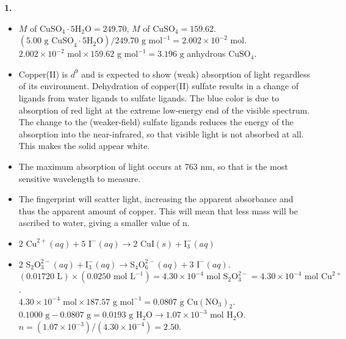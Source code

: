 \documentclass[10pt,a4paper]{article}
\begin{document}
\textbf{1.}
\begin{itemize}
    \item[a.] $M$ of $\text{CuSO}_4\cdot5\text{H}_2\text{O} = 249.70$, $M$ of $\text{CuSO}_4 = 159.62$. \\
    $(5.00\text{ g CuSO}_4\cdot5\text{H}_2\text{O})/249.70\text{ g mol}^{-1} = 2.002 \times 10^{-2}\text{ mol}$. \\
    $2.002 \times 10^{-2}\text{ mol} \times 159.62\text{ g mol}^{-1} = 3.196\text{ g}$ anhydrous $\text{CuSO}_4$.
     \item[b.] Copper(II) is $d^9$ and is expected to show (weak) absorption of light regardless of its environment. Dehydration of copper(II) sulfate results in a change of ligands from water ligands to sulfate ligands. The blue color is due to absorption of red light at the extreme low-energy end of the visible spectrum. The change to the (weaker-field) sulfate ligands reduces the energy of the absorption into the near-infrared, so that visible light is not absorbed at all. This makes the solid appear white.
    \item[c.] The maximum absorption of light occurs at 763 nm, so that is the most sensitive wavelength to measure.
    \item[d.] The fingerprint will scatter light, increasing the apparent absorbance and thus the apparent amount of copper. This will mean that less mass will be ascribed to water, giving a smaller value of n.
    \item[e.] $2\text{ Cu}^{2+}(aq) + 5\text{ I}^-(aq) \rightarrow 2\text{ CuI}(s) + \text{I}_3^-(aq)$
    \item[f.] $2\text{ S}_2\text{O}_3^{2-}(aq) + \text{I}_3^-(aq) \rightarrow \text{S}_4\text{O}_6^{2-}(aq) + 3\text{ I}^-(aq)$. \\
    $(0.01720\text{ L}) \times (0.0250\text{ mol L}^{-1}) = 4.30 \times 10^{-4}\text{ mol }\text{S}_2\text{O}_3^{2-} = 4.30 \times 10^{-4}\text{ mol }\text{Cu}^{2+}$. \\
    $4.30 \times 10^{-4}\text{ mol} \times 187.57\text{ g mol}^{-1} = 0.0807\text{ g }\text{Cu}(\text{NO}_3)_2$. \\
    $0.1000\text{ g} - 0.0807\text{ g} = 0.0193\text{ g }\text{H}_2\text{O} \rightarrow 1.07 \times 10^{-3}\text{ mol }\text{H}_2\text{O}$. \\
    $n = (1.07 \times 10^{-3}) / (4.30 \times 10^{-4}) = 2.50$.
\end{itemize}
\end{document}
